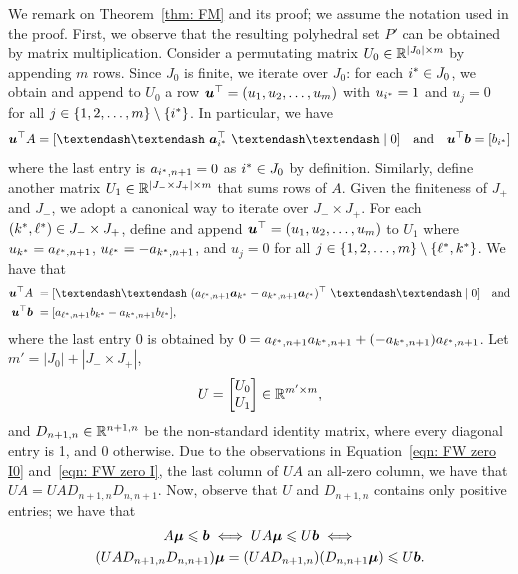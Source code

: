 We remark on Theorem~\ref{thm: FM} and its proof; we assume the notation used in the proof. First, we observe that the resulting polyhedral set $P'$ can be obtained by matrix multiplication. 
Consider a permutating matrix $U_0\in \mathbb R^{|J_0|\times m}$ by appending $m$ rows. Since $J_0$ is finite, we iterate over $J_0$: for each $i^\ast\in J_0$, we obtain and append to $U_0$ a row ${\boldsymbol u}^\top = (u_1, u_2, \dots, u_m)$ with $u_{i^\ast} = 1$ and $u_j = 0$ for all $j\in \{1,2,\dots, m\}\setminus\{i^\ast\}$. In particular, we have 
\begin{equation}\label{eqn: FW zero I0} \bmu^\top A = [\textendash\textendash\ \bma_{i\rast}^\top\ \textendash\textendash \mid 0] \quad\text{and}\quad \bmu^\top \bmb = [b_{i\rast}]  \end{equation} where the last entry is $a_{i^\ast, n+1} = 0$ as $i^\ast\in J_0$ by definition.
Similarly, define another matrix $U_1\in \mathbb R^{| J_- \times J_+ |\times m}$ that sums rows of $A$. Given the finiteness of $J_+$ and $J_-$, we adopt a canonical way to iterate over $J_- \times J_+$. For each $(k^\ast, \ell^\ast)\in J_-\times J_+$, define and append ${\boldsymbol u}^\top = (u_1, u_2, \dots, u_m)$ to $U_1$ where $u_{k^\ast} = a_{\ell^\ast, n+1}$, $u_{\ell^\ast} = -a_{k^\ast, n+1}$, and $u_j = 0$ for all $j\in \{ 1, 2, \dots, m \}\setminus \{\ell^\ast, k^\ast\}$. We have that 
\begin{equation}\label{eqn: FW zero I} \begin{split}
\bmu^\top A  ~& = [\textendash\textendash\   (a_{\ell\rast, n+1} \bma_{k\rast}  -a_{k\rast, n+1}\bma_{\ell\rast} )^\top\ \textendash\textendash\mid 0 ] \quad\text{and}\\ 
\bmu^\top\bmb~& = [ a_{\ell\rast, n+1}b_{k\rast} -a_{k\rast, n+1}b_{\ell\rast}], 
\end{split}\end{equation}
where the last entry 0 is obtained by $0 = a_{\ell^\ast, n+1} a_{k^\ast, n+1}  + (-a_{k^\ast, n+1})a_{\ell^\ast, n+1} $. Let $m' = |J_0| + |J_-\times J_+|$,  
\[  U = \begin{bmatrix} U_0 \\ U_1
\end{bmatrix} \in \mathbb R^{m' \times m}, \] and $D_{n+1, n}\in\mathbb R^{n+1, n}$ be the non-standard identity matrix, where every diagonal entry is 1, and 0 otherwise. Due to the observations in Equation~\ref{eqn: FW zero I0} and~\ref{eqn: FW zero I}, the last column of $UA$ an all-zero column, we have that $UA = UAD_{n+1, n}D_{n, n+1}$.  Now, observe that $U$ and $D_{n+1, n}$ contains only positive entries; we have that 
\begin{multline} 
A\boldsymbol\mu \leqslant {\boldsymbol b} \iff UA {\boldsymbol\mu}\leqslant U{\boldsymbol b} \iff \\
(UAD_{n+1, n} D_{n, n+1}) {\boldsymbol\mu} = (UAD_{n+1, n}) (D_{n, n+1} {\boldsymbol\mu}) \leqslant U{\boldsymbol b}. 
\end{multline}

